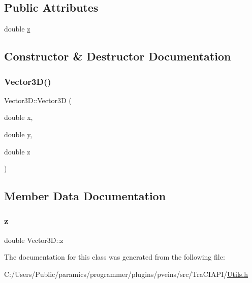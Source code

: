 \subsection*{Public Attributes}
\begin{DoxyCompactItemize}
\item 
double \hyperlink{class_vector3_d_a7321f3ff785f275c4d83f7d1b951752a}{z}
\end{DoxyCompactItemize}


\subsection{Constructor \& Destructor Documentation}
\mbox{\label{class_vector3_d_abd851542da40b1168edcad11fa83b7c2}} 
\subsubsection{\texorpdfstring{Vector3\+D()}{Vector3D()}}
{\footnotesize\ttfamily Vector3\+D\+::\+Vector3D (\begin{DoxyParamCaption}\item[{double}]{x,  }\item[{double}]{y,  }\item[{double}]{z }\end{DoxyParamCaption})\hspace{0.3cm}{\ttfamily [inline]}}



\subsection{Member Data Documentation}
\mbox{\label{class_vector3_d_a7321f3ff785f275c4d83f7d1b951752a}} 
\subsubsection{\texorpdfstring{z}{z}}
{\footnotesize\ttfamily double Vector3\+D\+::z}



The documentation for this class was generated from the following file\+:\begin{DoxyCompactItemize}
\item 
C\+:/\+Users/\+Public/paramics/programmer/plugins/pveins/src/\+Tra\+C\+I\+A\+P\+I/\hyperlink{_utils_8h}{Utils.\+h}\end{DoxyCompactItemize}
